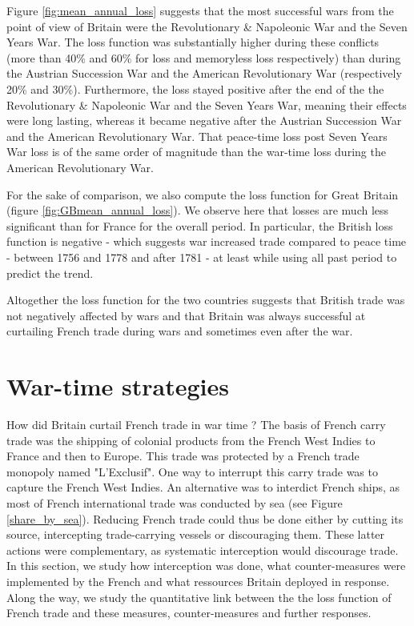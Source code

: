 \documentclass[12pt,a4paper,notitlepage,english]{article}
\begin{document}
Figure \ref{fig:mean_annual_loss} suggests that the most successful wars from the point of view of Britain were the Revolutionary \& Napoleonic War and the Seven Years War.
The loss function was substantially higher during these conflicts (more than 40\% and 60\% for loss and memoryless loss respectively) than during the Austrian Succession War and the American Revolutionary War (respectively 20\% and 30\%).
Furthermore, the loss stayed positive after the end of the the Revolutionary \& Napoleonic War and the Seven Years War, meaning their effects were long lasting, whereas it became negative after the Austrian Succession War and the American Revolutionary War.
That peace-time loss post Seven Years War loss is of the same order of magnitude than the war-time loss during the American Revolutionary War.

For the sake of comparison, we also compute the loss function for Great Britain (figure \ref{fig:GBmean_annual_loss}).
We observe here that losses are much less significant than for France for the overall period. In particular, the British loss function is negative - which suggests war increased trade compared to peace time - between 1756 and 1778 and after 1781 - at least while using all past period to predict the trend.

Altogether the loss function for the two countries suggests that British trade was not negatively affected by wars and that Britain was always successful at curtailing French trade during wars and sometimes even after the war.  

\section{War-time strategies}
\label{sec:wartime_strategies}

How did Britain curtail French trade in war time ?
The basis of French carry trade was the shipping of colonial products from the French West Indies to France and then to Europe.
This trade was protected by a French trade monopoly named "L’Exclusif".
One way to interrupt this carry trade was to capture the French West Indies.
An alternative was to interdict French ships, as most of French international trade was conducted by sea (see Figure \ref{share_by_sea}).
Reducing French trade could thus be done either by cutting its source, intercepting trade-carrying vessels or discouraging them.
These latter actions were complementary, as systematic interception would discourage trade. 
In this section, we study how interception was done, what counter-measures were implemented by the French and what ressources Britain deployed in response.
Along the way, we study the quantitative link between the the loss function of French trade and these measures, counter-measures and further responses.
\end{document}
